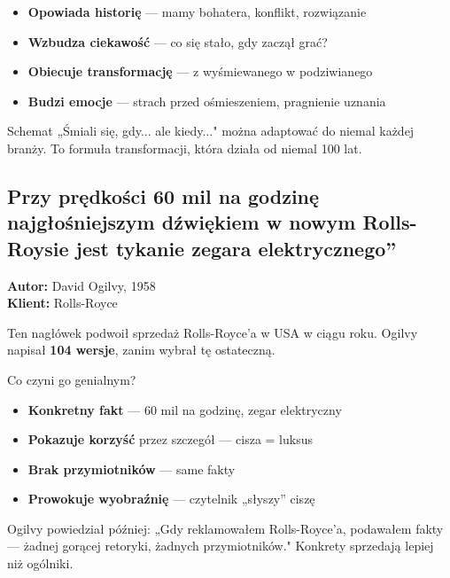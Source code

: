\documentclass[
  12pt,
  a4paper,
  twoside,
  openright,
  12pt,
  DIV=12,
  BCOR=12mm]{scrbook}
\providecommand{\tightlist}{%
  \setlength{\itemsep}{0pt}\setlength{\parskip}{0pt}}\usepackage{longtable,booktabs,array}
\begin{document}
\begin{itemize}
\tightlist
\item
  \textbf{Opowiada historię} --- mamy bohatera, konflikt, rozwiązanie
\item
  \textbf{Wzbudza ciekawość} --- co się stało, gdy zaczął grać?
\item
  \textbf{Obiecuje transformację} --- z wyśmiewanego w podziwianego
\item
  \textbf{Budzi emocje} --- strach przed ośmieszeniem, pragnienie
  uznania
\end{itemize}

\begin{wskazowka}
Schemat „Śmiali się, gdy... ale kiedy..." można adaptować do niemal każdej branży. To formuła transformacji, która działa od niemal 100 lat.
\end{wskazowka}

\subsection{Przy prędkości 60 mil na godzinę najgłośniejszym dźwiękiem w
nowym Rolls-Roysie jest tykanie zegara
elektrycznego''}\label{przy-prux119dkoux15bci-60-mil-na-godzinux119-najgux142oux15bniejszym-dux17awiux119kiem-w-nowym-rolls-roysie-jest-tykanie-zegara-elektrycznego}

\textbf{Autor:} David Ogilvy, 1958\\
\textbf{Klient:} Rolls-Royce

Ten nagłówek podwoił sprzedaż Rolls-Royce'a w USA w ciągu roku. Ogilvy
napisał \textbf{104 wersje}, zanim wybrał tę ostateczną.

Co czyni go genialnym?

\begin{itemize}
\tightlist
\item
  \textbf{Konkretny fakt} --- 60 mil na godzinę, zegar elektryczny
\item
  \textbf{Pokazuje korzyść} przez szczegół --- cisza = luksus
\item
  \textbf{Brak przymiotników} --- same fakty
\item
  \textbf{Prowokuje wyobraźnię} --- czytelnik „słyszy'' ciszę
\end{itemize}

\begin{wazne}
Ogilvy powiedział później: „Gdy reklamowałem Rolls-Royce'a, podawałem fakty --- żadnej gorącej retoryki, żadnych przymiotników." Konkrety sprzedają lepiej niż ogólniki.
\end{wazne}
\end{document}
